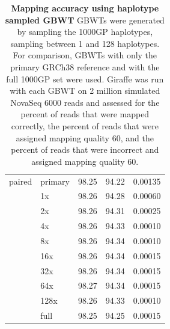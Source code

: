 \documentclass[11pt]{ucscthesis}
\begin{document}
\begin{table}[H]
\begin{tabular}{|l|l|r|r|r|}
        \hline
        paired  & primary   & 98.25     & 94.22     & 0.00135 \\
                & 1x        & 98.26     & 94.28     & 0.00060 \\
                & 2x        & 98.26     & 94.31     & 0.00025 \\
                & 4x        & 98.26     & 94.33     & 0.00010 \\
                & 8x        & 98.26     & 94.34     & 0.00010 \\
                & 16x       & 98.26     & 94.34     & 0.00015 \\
                & 32x       & 98.26     & 94.34     & 0.00015 \\
                & 64x       & 98.27     & 94.34     & 0.00015 \\
                & 128x      & 98.26     & 94.33     & 0.00010 \\
                & full      & 98.25     & 94.25     & 0.00015 \\
                

        \hline
        
    \end{tabular}
    \caption[Mapping accuracy using haplotype sampled GBWT]{\textbf{Mapping accuracy using haplotype sampled GBWT} GBWTs were generated by sampling the 1000GP haplotypes, sampling between 1 and 128 haplotypes. For comparison, GBWTs with only the primary GRCh38 reference and with the full 1000GP set were used. Giraffe was run with each GBWT on 2 million simulated NovaSeq 6000 reads and assessed for the percent of reads that were mapped correctly, the percent of reads that were assigned mapping quality 60, and the percent of reads that were incorrect and assigned mapping quality 60.}
    \label{tab:mapping_accuracy_1000gp_sampled_gbwt}
\end{table}
\end{document}
